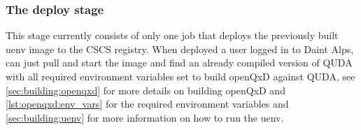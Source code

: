 \subsubsection{The deploy stage}

This stage currently consists of only one job that deploys the previously built uenv image to the CSCS registry. When deployed a user logged in to Daint Alps, can just pull and start the image and find an already compiled version of QUDA with all required environment variables set to build openQxD against QUDA, see \cref{sec:building:openqxd} for more details on building openQxD and \cref{lst:openqxd:env_vars} for the required environment variables and \cref{sec:building:uenv} for more information on how to run the uenv.
